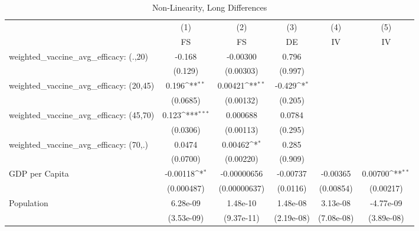 \begin{table}[htbp]\centering
\def\sym#1{\ifmmode^{#1}\else\(^{#1}\)\fi}
\caption{Non-Linearity, Long Differences}
\begin{tabular}{l*{5}{c}}
\toprule
                &\multicolumn{1}{c}{(1)}&\multicolumn{1}{c}{(2)}&\multicolumn{1}{c}{(3)}&\multicolumn{1}{c}{(4)}&\multicolumn{1}{c}{(5)}\\
                &\multicolumn{1}{c}{FS}&\multicolumn{1}{c}{FS}&\multicolumn{1}{c}{DE}&\multicolumn{1}{c}{IV}&\multicolumn{1}{c}{IV}\\
\midrule
weighted\_vaccine\_avg\_efficacy: (.,20)&   -0.168         & -0.00300         &    0.796         &                  &                  \\
                &  (0.129)         &(0.00303)         &  (0.997)         &                  &                  \\
\addlinespace
weighted\_vaccine\_avg\_efficacy: (20,45)&    0.196\sym{**} &  0.00421\sym{**} &   -0.429\sym{*}  &                  &                  \\
                & (0.0685)         &(0.00132)         &  (0.205)         &                  &                  \\
\addlinespace
weighted\_vaccine\_avg\_efficacy: (45,70)&    0.123\sym{***}& 0.000688         &   0.0784         &                  &                  \\
                & (0.0306)         &(0.00113)         &  (0.295)         &                  &                  \\
\addlinespace
weighted\_vaccine\_avg\_efficacy: (70,.)&   0.0474         &  0.00462\sym{*}  &    0.285         &                  &                  \\
                & (0.0700)         &(0.00220)         &  (0.909)         &                  &                  \\
\addlinespace
GDP per Capita  & -0.00118\sym{*}  &-0.00000656         & -0.00737         & -0.00365         &  0.00700\sym{**} \\
                &(0.000487)         &(0.00000637)         & (0.0116)         &(0.00854)         &(0.00217)         \\
\addlinespace
Population      & 6.28e-09         & 1.48e-10         & 1.48e-08         & 3.13e-08         &-4.77e-09         \\
                &(3.53e-09)         &(9.37e-11)         &(2.19e-08)         &(7.08e-08)         &(3.89e-08)         \\

\end{tabular}
\end{table}

